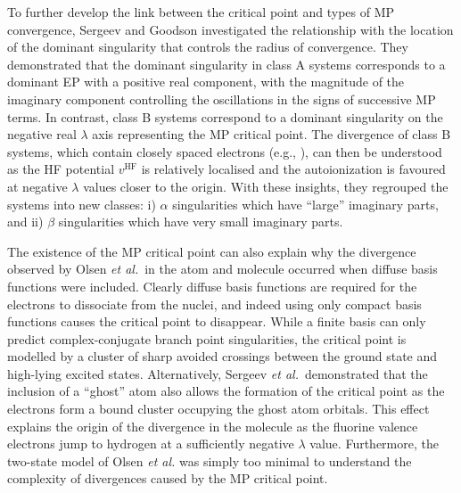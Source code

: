 \documentclass[aps,prb,reprint,noshowkeys,superscriptaddress]{revtex4-1}
\newcommand{\latin}[1]{#1}
\newcommand{\eg}{\latin{e.g.}}
\newcommand{\etal}{\textit{et al.}}
\begin{document}
To further develop the link between the critical point and types of MP convergence, Sergeev and Goodson investigated
the relationship with the location of the dominant singularity that controls the radius of convergence.\cite{Goodson_2004}
They demonstrated that the dominant singularity in class A systems corresponds to a dominant EP with a positive real component, 
with the magnitude of the imaginary component controlling the oscillations in the signs of successive MP 
terms.\cite{Goodson_2000a,Goodson_2000b}
In contrast, class B systems correspond to a dominant singularity on the negative real $\lambda$ axis representing
the MP critical point.
The divergence of class B systems, which contain closely spaced electrons (\eg, ), can then be understood as the 
HF potential $v^{\text{HF}}$ is relatively localised and the autoionization is favoured at negative 
$\lambda$ values closer to the origin.
With these insights, they regrouped the systems into new classes: i) $\alpha$ singularities which have ``large'' imaginary parts, 
and ii) $\beta$ singularities which have very small imaginary parts.\cite{Goodson_2004,Sergeev_2006} 

The existence of the MP critical point can also explain why the divergence observed by Olsen \etal\ in the  atom 
and  molecule occurred when diffuse basis functions were included.\cite{Olsen_1996}
Clearly diffuse basis functions are required for the electrons to dissociate from the nuclei, and indeed using
only compact basis functions causes the critical point to disappear.
While a finite basis can only predict complex-conjugate branch point singularities, the critical point is modelled
by a cluster of sharp avoided crossings between the ground state and high-lying excited states.\cite{Sergeev_2005}
Alternatively, Sergeev \etal\ demonstrated that the inclusion of a ``ghost'' atom also
allows the formation of the critical point as the electrons form a bound cluster occupying the ghost atom orbitals.\cite{Sergeev_2005}
This effect explains the origin of the divergence in the  molecule as the fluorine valence electrons jump to hydrogen at
 a sufficiently negative $\lambda$ value.\cite{Sergeev_2005}
Furthermore, the two-state model of Olsen \etal{}\cite{Olsen_2000} was simply too minimal to understand the complexity of 
divergences caused by the MP critical point.
\end{document}
